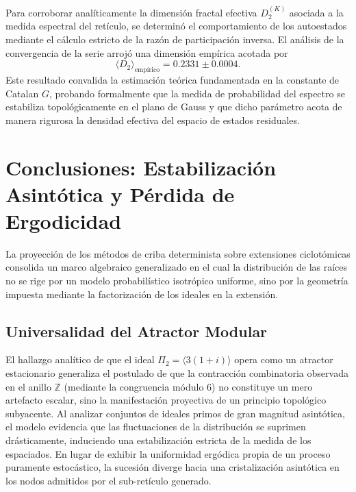 \documentclass{article}
\numberwithin{equation}{section}
\theoremstyle{plain}
\theoremstyle{definition}
\begin{document}
Para corroborar analíticamente la dimensión fractal efectiva $D_2^{(K)}$ asociada a la medida espectral del retículo, se determinó el comportamiento de los autoestados mediante el cálculo estricto de la razón de participación inversa. El análisis de la convergencia de la serie arrojó una dimensión empírica acotada por
\begin{equation}
    \langle D_2 \rangle_{\text{empírico}} = 0.2331 \pm 0.0004.
\end{equation}
Este resultado convalida la estimación teórica fundamentada en la constante de Catalan $G$, probando formalmente que la medida de probabilidad del espectro se estabiliza topológicamente en el plano de Gauss y que dicho parámetro acota de manera rigurosa la densidad efectiva del espacio de estados residuales.

\section{Conclusiones: Estabilización Asintótica y Pérdida de Ergodicidad}
\label{sec:discusion_conclusiones}

La proyección de los métodos de criba determinista sobre extensiones ciclotómicas consolida un marco algebraico generalizado en el cual la distribución de las raíces no se rige por un modelo probabilístico isotrópico uniforme, sino por la geometría impuesta mediante la factorización de los ideales en la extensión.

\subsection{Universalidad del Atractor Modular}

El hallazgo analítico de que el ideal $\Pi_2 = \langle 3(1+i) \rangle$ opera como un atractor estacionario generaliza el postulado de que la contracción combinatoria observada en el anillo $\mathbb{Z}$ (mediante la congruencia módulo $6$) no constituye un mero artefacto escalar, sino la manifestación proyectiva de un principio topológico subyacente. Al analizar conjuntos de ideales primos de gran magnitud asintótica, el modelo evidencia que las fluctuaciones de la distribución se suprimen drásticamente, induciendo una estabilización estricta de la medida de los espaciados. En lugar de exhibir la uniformidad ergódica propia de un proceso puramente estocástico, la sucesión diverge hacia una cristalización asintótica en los nodos admitidos por el sub-retículo generado.
\end{document}
